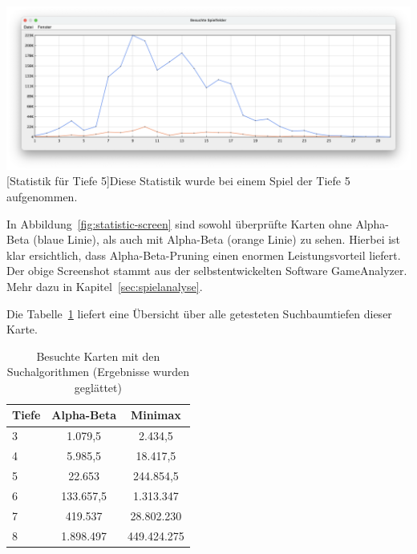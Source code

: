 \vspace{1em}
\begin{minipage}{\linewidth}
    \centering
    \includegraphics[width=0.9\linewidth]{statistic/ORIGINAL-D5-01/ST-01-D5-LD}
    [Statistik für Tiefe 5]{Diese Statistik wurde bei einem Spiel der Tiefe 5 aufgenommen.}
    \label{fig:statistic-screen}
\end{minipage}

In Abbildung~\ref{fig:statistic-screen} sind sowohl \"uberpr\"ufte Karten ohne Alpha-Beta (blaue Linie), als auch mit Alpha-Beta (orange Linie) zu sehen.
Hierbei ist klar ersichtlich, dass Alpha-Beta-Pruning einen enormen Leistungsvorteil liefert.
Der obige Screenshot stammt aus der selbstentwickelten Software GameAnalyzer.
Mehr dazu in Kapitel~\ref{sec:spielanalyse}.

Die Tabelle~\ref{tab:search-depth} liefert eine \"Ubersicht \"uber alle getesteten Suchbaumtiefen dieser Karte.

\vspace{1em}
\begin{table}[!h]
    \centering
    \begin{tabular}{|l|c|c|}
        \hline
        \textbf{Tiefe} & \textbf{Alpha-Beta} & \textbf{Minimax}\\
        \hline
        3 & 1.079,5 & 2.434,5\\
        \hline
        4 & 5.985,5 & 18.417,5\\
        \hline
        5 & 22.653 & 244.854,5\\
        \hline
        6 & 133.657,5 & 1.313.347\\
        \hline
        7 & 419.537 & 28.802.230\\
        \hline
        8 & 1.898.497 & 449.424.275\\
        \hline
    \end{tabular}
    \caption{Besuchte Karten mit den Suchalgorithmen (Ergebnisse wurden geglättet)}
    \label{tab:search-depth}
\end{table}

